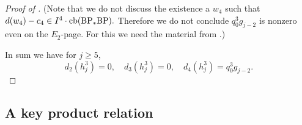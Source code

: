 \begin{proof}[Proof of ]
  (Note that we do not discuss the existence a $w_4$ such that 
  $d(w_4) - c_4 \in I^{4} \cdot \mathrm{cb}(\mathrm{BP}_*\mathrm{BP}).$ Therefore we do not conclude $q_0^3 g_{j-2}$ is nonzero even on the $E_2$-page. For this we need the material from .)
  
  In sum we have for $j \geq 5$,
  \[ d_2(h_j^3) = 0, \quad d_3(h_j^3) = 0, \quad d_4(h_j^3) = q_0^3 g_{j-2}.\]
  
  
\end{proof}





\subsection{A key product relation}
\label{subsec:product-reln}\ 


